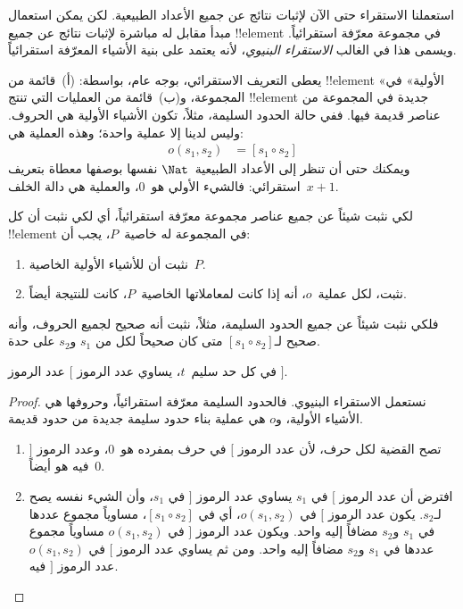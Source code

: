\documentclass[../../../include/open-logic-section]{subfiles}
\begin{document}


استعملنا الاستقراء حتى الآن لإثبات نتائج عن جميع الأعداد الطبيعية. لكن
يمكن استعمال مبدأ مقابل له مباشرة لإثبات نتائج عن جميع !!{element} في
مجموعة معرّفة استقرائياً. ويسمى هذا في الغالب \emph{الاستقراء البنيوي}،
لأنه يعتمد على بنية الأشياء المعرّفة استقرائياً.

يعطى التعريف الاستقرائي، بوجه عام، بواسطة: (أ)~قائمة من !!{element}
«الأولية» في المجموعة، و(ب)~قائمة من العمليات التي تنتج !!{element}
جديدة في المجموعة من عناصر قديمة فيها. ففي حالة الحدود السليمة، مثلاً،
تكون الأشياء الأولية هي الحروف. وليس لدينا إلا عملية واحدة؛ وهذه العملية
هي:
\begin{align*}
  o(s_1, s_2) &= [s_1 \circ s_2]
\end{align*}
ويمكنك حتى أن تنظر إلى الأعداد الطبيعية~$\Nat$ نفسها بوصفها معطاة
بتعريف استقرائي: فالشيء الأولي هو~$0$، والعملية هي دالة الخلف~$x + 1$.

لكي نثبت شيئاً عن جميع عناصر مجموعة معرّفة استقرائياً، أي لكي نثبت أن كل
!!{element} في المجموعة له خاصية~$P$، يجب أن:
\begin{enumerate}
\item نثبت أن للأشياء الأولية الخاصية~$P$.
\item نثبت، لكل عملية~$o$، أنه إذا كانت لمعاملاتها الخاصية~$P$، كانت
  للنتيجة أيضاً.
\end{enumerate}
فلكي نثبت شيئاً عن جميع الحدود السليمة، مثلاً، نثبت أنه صحيح لجميع
الحروف، وأنه صحيح لـ$[s_1 \circ s_2]$ متى كان صحيحاً لكل من $s_1$
و$s_2$ على حدة.

\begin{prop}
  في كل حد سليم~$t$، يساوي عدد الرموز $[$ عدد الرموز $]$.
\end{prop}

\begin{proof}
نستعمل الاستقراء البنيوي. فالحدود السليمة معرّفة استقرائياً، وحروفها هي
الأشياء الأولية، و$o$ هي عملية بناء حدود سليمة جديدة من حدود قديمة.
\begin{enumerate}
\item تصح القضية لكل حرف، لأن عدد الرموز $[$ في حرف بمفرده هو~$0$،
  وعدد الرموز $]$ فيه هو أيضاً~$0$.
\item افترض أن عدد الرموز $[$ في $s_1$ يساوي عدد الرموز $]$ في
  $s_1$، وأن الشيء نفسه يصح لـ$s_2$. يكون عدد الرموز $[$ في
  $o(s_1, s_2)$، أي في $[s_1 \circ s_2]$، مساوياً مجموع عددها في
  $s_1$ و$s_2$ مضافاً إليه واحد. ويكون عدد الرموز $]$ في
  $o(s_1, s_2)$ مساوياً مجموع عددها في $s_1$ و$s_2$ مضافاً إليه
  واحد. ومن ثم يساوي عدد الرموز $[$ في $o(s_1, s_2)$ عدد الرموز $]$
  فيه.
\end{enumerate}
\end{proof}
\end{document}
